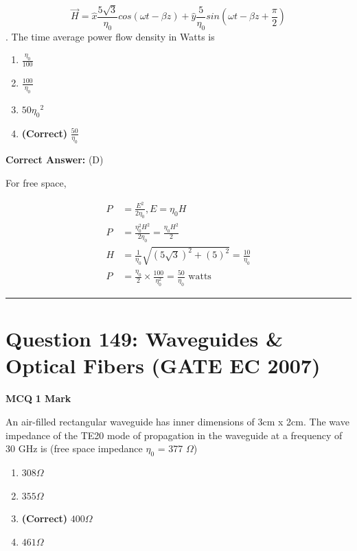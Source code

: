 \documentclass[11pt,a4paper]{article}
\begin{document}
\[
\vec{H}=\hat{x}\frac{5\sqrt{3}}{\eta _{0}}cos(\omega t-\beta z)+\hat{y}\frac{5}{\eta _{0}}sin(\omega t-\beta z+\frac{\pi }{2})
\]
.  
The time average power flow density in Watts is


\begin{enumerate}[label=(\Alph*)]
    \item $\frac{\eta _{0}}{100}$
    \item $\frac{100}{\eta _{0}}$
    \item $50 {\eta _{0}}^{2}$
    \item \textbf{(Correct)} $\frac{50}{\eta _{0}}$
\end{enumerate}

\noindent \textbf{Correct Answer:} (D)

\begin{tcolorbox}[solbox, title=Detailed Solution -- Question 148]
For free space,

\[
\begin{aligned} P&=\frac{E^{2}}{2 \eta_{0}}, E=\eta_{0} H \\ P&=\frac{\eta_{0}^{2} H^{2}}{2 \eta_{0}}=\frac{\eta_{0} H^{2}}{2} \\ H&=\frac{1}{\eta_{0}} \sqrt{(5 \sqrt{3})^{2}+(5)^{2}}=\frac{10}{\eta_{0}} \\ P&=\frac{\eta_{0}}{2} \times \frac{100}{\eta_{0}^{2}}=\frac{50}{\eta_{0}} \text { watts } \end{aligned}
\]
\end{tcolorbox}

\vspace{1.5em}
\hrule
\vspace{1.5em}

\section*{Question 149: Waveguides \& Optical Fibers (GATE EC 2007)}
\noindent \textbf{\color{primary}MCQ} \hfill \textbf{\color{secondary}1 Mark}


\noindent An air-filled rectangular waveguide has inner dimensions of 3cm x 2cm.
The wave impedance of the TE20  mode of propagation in the waveguide at a
frequency of 30 GHz is (free space impedance $\eta_{0}$ = 377 $\Omega$)


\begin{enumerate}[label=(\Alph*)]
    \item $308\Omega$
    \item $355\Omega$
    \item \textbf{(Correct)} $400\Omega$
    \item $461\Omega$
\end{enumerate}
\end{document}
